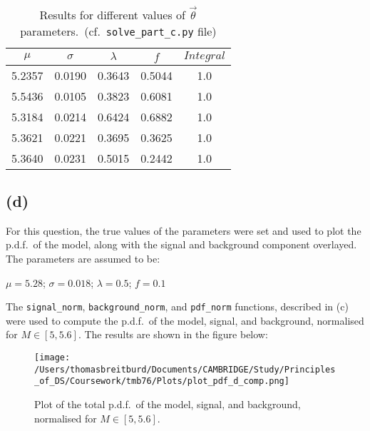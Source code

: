 \documentclass[12pt]{report} %
\begin{document}
\begin{center}
    \begin{table}[htbp]
        \begin{tabular}{ |c|c|c|c|c| } 
            \hline
            $\mu$ & $\sigma$ & $\lambda$ & $f$ & $Integral$ \\ 
            \hline
            5.2357 & 0.0190 & 0.3643 & 0.5044 & 1.0 \\ 
            \hline
            5.5436 & 0.0105 & 0.3823 & 0.6081 & 1.0 \\ 
            \hline
            5.3184 & 0.0214 & 0.6424 & 0.6882 & 1.0 \\ 
            \hline
            5.3621 & 0.0221 & 0.3695 & 0.3625 & 1.0 \\ 
            \hline
            5.3640 & 0.0231 & 0.5015 & 0.2442 & 1.0 \\ 
            \hline
        \end{tabular}
        \centering
        \caption{Results for different values of $\vec{\theta}$ parameters.\ (cf.\ \texttt{solve\_part\_c.py} file)}
    \end{table}
\end{center}

\subsection*{(d)}

For this question, the true values of the parameters were set and used to plot the p.d.f.\ of the model, along with the signal and background component overlayed. The parameters are assumed to be:

\begin{center}
    $\mu = 5.28$;  
    $\sigma = 0.018$; 
    $\lambda = 0.5$; 
    $f = 0.1$
\end{center}

The \texttt{signal\_norm}, \texttt{background\_norm}, and \texttt{pdf\_norm} functions, described in (c) were used to compute the p.d.f.\ of the model, signal, and background, normalised for $M\in{[5,5.6]}$. The results are shown in the figure below:

\newpage

\begin{figure}[htbp]
    \centering
    \texttt{[image: /Users/thomasbreitburd/Documents/CAMBRIDGE/Study/Principles\_of\_DS/Coursework/tmb76/Plots/plot\_pdf\_d\_comp.png]}
    \captionsetup{margin=1.3cm}
    \caption[width=0.2\pdfpagewidth]{Plot of the total p.d.f.\ of the model, signal, and background, normalised for $M\in{[5,5.6]}$.}
\end{figure}  
\end{document}
